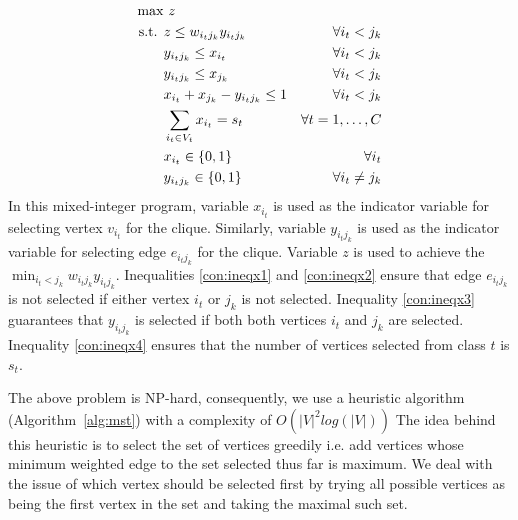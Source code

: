{\footnotesize
\begin{align}
\max        & \notag
             \   z \\
\text{s.t.     }&\label{con:min}
			 z\le w_{i_tj_k} y_{i_tj_k}           & \forall i_t< j_k\\
			& \label{con:ineqx1}
              y_{i_tj_k} \leq x_{i_t}             & \forall i_t< j_k \\
            & \label{con:ineqx2}
              y_{i_tj_k} \leq x_{j_k}             & \forall i_t< j_k\\
            & \label{con:ineqx3}
            x_{i_t}+x_{j_k}-y_{i_tj_k}\le 1     & \forall i_t< j_k \\  
            & \label{con:ineqx4}
            \sum_{i_t\in V_t} x_{i_t}= s_t        & \forall t=1,\ldots , C \\
            & \notag
            x_{i_t} \in\{0,1\}        & \forall i_t\\
            & \notag
            y_{i_tj_k} \in\{0,1\}                 & \forall i_t\neq j_k
\end{align}
} 
In this mixed-integer program, variable $x_{i_t}$ is used as the indicator variable for selecting vertex $v_{i_t}$ for the clique.  Similarly, variable $y_{i_tj_k}$ is used as the indicator variable for selecting edge $e_{i_tj_k}$ for the clique.  Variable $z$ is used to achieve the $\min_{i_t<j_k}{w_{i_tj_k} y_{i_tj_k} }$.
Inequalities \ref{con:ineqx1} and \ref{con:ineqx2} ensure that edge $e_{i_tj_k}$ is not selected if either vertex $i_t$ or $j_k$ is not selected.  Inequality \ref{con:ineqx3} guarantees that  $y_{i_tj_k}$ is selected if both both vertices $i_t$ and $j_k$ are selected. Inequality \ref{con:ineqx4} ensures that the number of vertices selected from class $t$ is $s_t$.

The above problem is NP-hard, consequently, we use a heuristic algorithm
(Algorithm~\ref{alg:mst}) with a complexity of $O(|V|^2log(|V|))$
%
The idea behind this heuristic is to select the set of vertices greedily i.e. add vertices whose minimum weighted edge to the set selected thus far is maximum.  We deal with the issue of which vertex should be selected first by trying all possible vertices as being the first vertex in the set and taking the maximal such set.

